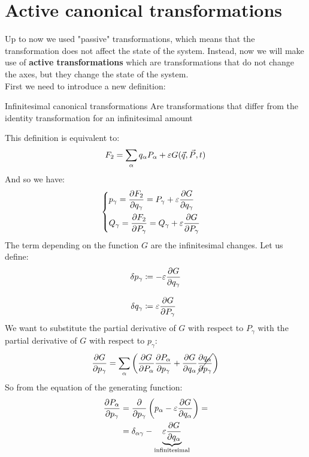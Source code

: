 \section{Active canonical transformations}
Up to now we used "passive" transformations, which means that the transformation does not affect the state of the system. Instead, now we will make use of \textbf{active transformations} which are transformations that do not change the axes, but they change the state of the system.\\
First we need to introduce a new definition:
\begin{definition}{Infinitesimal canonical transformations}
    Are transformations that differ from the identity transformation for an infinitesimal amount
\end{definition}
This definition is equivalent to:
\begin{equation}
    F_2 = \displaystyle\sum_{\alpha} q_{\alpha}P_{\alpha} + \varepsilon G(\vec{q},\vec{P},t)
\end{equation}
And so we have:
\begin{equation}
    \begin{cases}
        p_{\gamma} = \pdv{F_2}{q_{\gamma}} = P_{\gamma} + \varepsilon\pdv{ G}{q_{\gamma}}\\[10pt]
        Q_{\gamma} = \pdv{F_2}{P_{\gamma}} = Q_{\gamma} + \varepsilon\pdv{ G}{P_{\gamma}}
    \end{cases}
\end{equation}
The term depending on the function $G$ are the infinitesimal changes. Let us define:
\begin{equation}
    \begin{split}
        \delta p_{\gamma} &\defineeq -\varepsilon\pdv{ G}{q_{\gamma}}\\[8pt]
        \delta q_{\gamma} &\defineeq \varepsilon\pdv{ G}{P_{\gamma}}
    \end{split}
\end{equation}
We want to substitute the partial derivative of $G$ with respect to $P_{\gamma}$ with the partial derivative of $G$ with respect to $p_{\gamma}$:
\begin{equation}
    \pdv{G}{p_{\gamma}} = \bigsum_{\alpha} \brackets{\pdv{G}{P_{\alpha}}\pdv{P_{\alpha}}{p_{\gamma}} + \pdv{G}{q_{\alpha}}\cancel{\pdv{q_{\alpha}}{p_{\gamma}}}}
\end{equation}
So from the equation of the generating function:
\begin{equation}
    \begin{split}
        \pdv{P_{\alpha}}{p_{\gamma}} &= \pdv{}{p_{\gamma}}\brackets{p_{\alpha} - \varepsilon\pdv{ G}{q_{\alpha}}} = \\
        &= \delta_{\alpha \gamma} - \underbrace{\varepsilon\pdv{ G}{q_{\alpha}}}_{\text{infinitesimal}}
    \end{split}
\end{equation}

